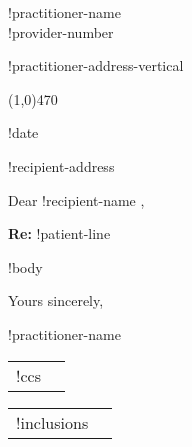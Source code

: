 \documentclass{article}
\begin{document}
\linethickness{0.4mm}

\noindent
\parbox[t]{8cm}{!practitioner-name\\!provider-number} \parbox[t]{8cm}{\raggedleft !practitioner-address-vertical}
\vspace{-0.55cm}

\noindent
\begin{center}
\line(1,0){470}
\end{center}

\begin{flushright} 
!date
\end{flushright}

\noindent 
{\raggedright
!recipient-address }

\vspace{1cm}

\noindent
Dear !recipient-name ,

\vspace{0.4cm}

\noindent
\textbf{Re:} !patient-line

\vspace{0.5cm}

!body

\vspace{1cm}

Yours sincerely,

\vspace{3cm}

!practitioner-name

\begin{tabular}{rr}
!ccs
\end{tabular}

\begin{tabular}{rr}
!inclusions
\end{tabular}
\end{document}
